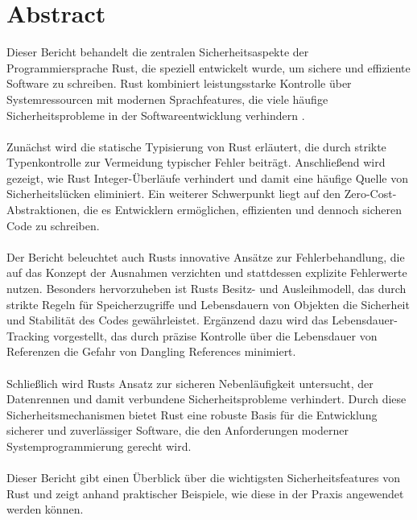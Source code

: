 \section*{Abstract}
\label{sec:abstract}

Dieser Bericht behandelt die zentralen Sicherheitsaspekte der Programmiersprache Rust, die speziell entwickelt wurde, um sichere und effiziente Software zu schreiben. 
Rust kombiniert leistungsstarke Kontrolle über Systemressourcen mit modernen Sprachfeatures, die viele häufige Sicherheitsprobleme in der Softwareentwicklung verhindern \cite{RustDoc2024}.\\
\\
Zunächst wird die statische Typisierung von Rust erläutert, die durch strikte Typenkontrolle zur Vermeidung typischer Fehler beiträgt. 
Anschließend wird gezeigt, wie Rust Integer-Überläufe verhindert und damit eine häufige Quelle von Sicherheitslücken eliminiert. 
Ein weiterer Schwerpunkt liegt auf den Zero-Cost-Abstraktionen, die es Entwicklern ermöglichen, effizienten und dennoch sicheren Code zu schreiben.\\
\\
Der Bericht beleuchtet auch Rusts innovative Ansätze zur Fehlerbehandlung, die auf das Konzept der Ausnahmen verzichten und stattdessen explizite Fehlerwerte nutzen. 
Besonders hervorzuheben ist Rusts Besitz- und Ausleihmodell, das durch strikte Regeln für Speicherzugriffe und Lebensdauern von Objekten die Sicherheit und Stabilität des Codes gewährleistet. 
Ergänzend dazu wird das Lebensdauer-Tracking vorgestellt, das durch präzise Kontrolle über die Lebensdauer von Referenzen die Gefahr von Dangling References minimiert.\\
\\
Schließlich wird Rusts Ansatz zur sicheren Nebenläufigkeit untersucht, der Datenrennen und damit verbundene Sicherheitsprobleme verhindert. 
Durch diese Sicherheitsmechanismen bietet Rust eine robuste Basis für die Entwicklung sicherer und zuverlässiger Software, die den Anforderungen moderner Systemprogrammierung gerecht wird.\\
\\
Dieser Bericht gibt einen Überblick über die wichtigsten Sicherheitsfeatures von Rust und zeigt anhand praktischer Beispiele, wie diese in der Praxis angewendet werden können.
